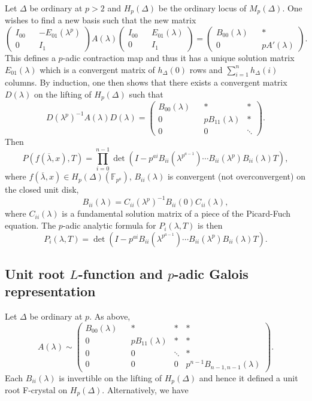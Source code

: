 \documentclass[a4paper,oneside,11pt]{article}
\theoremstyle{plain} \theoremstyle{definition}
\theoremstyle{remark}
\newcommand{\f}{\mathbb{F}}
\begin{document}
Let $\Delta$ be ordinary at $p>2$ and $H_p(\Delta)$ be the ordinary
locus of $M_p(\Delta)$. One wishes to find a new basis such that 
the new matrix 
$$\begin{pmatrix}I_{00} && -E_{01}(\lambda^p) \\
0 && I_1\end{pmatrix} 
A(\lambda)
\begin{pmatrix}I_{00} && E_{01}(\lambda) \\
0 && I_1\end{pmatrix}
=\begin{pmatrix}
B_{00}(\lambda)&&*\\ 0&&pA'(\lambda) \end{pmatrix}.$$ 
This defines a $p$-adic contraction map and thus 
it has a unique solution matrix $E_{01}(\lambda)$ which is a 
convergent matrix of $h_{\Delta}(0)$ rows and $\sum_{i=1}^n h_{\Delta}(i)$ columns. 
By induction, one then shows that there exists a convergent matrix
$D(\lambda)$ on the lifting of $H_p(\Delta)$ such that
$$D(\lambda^p)^{-1}A(\lambda)D(\lambda)=\begin{pmatrix}
B_{00}(\lambda)&&*&*\\ 0&&pB_{11}(\lambda)&*\\
0&&0&\ddots\end{pmatrix}.$$ 
Then
$$P(f(\overline{\lambda},x),T)
=\prod_{i=0}^{n-1}\det\left(I-p^{ai}B_{ii}(\lambda^{p^{a-1}})\cdots
B_{ii}(\lambda^p)B_{ii}(\lambda)T\right),$$ where
$f(\overline{\lambda}, x)\in H_p(\Delta)(\f_{p^a})$,
$B_{ii}(\lambda)$ is convergent (not overconvergent) on the closed unit disk,
$$B_{ii}(\lambda)=C_{ii}(\lambda^p)^{-1}B_{ii}(0)C_{ii}(\lambda),$$
where $C_{ii}(\lambda)$ is a fundamental solution matrix of a
piece of the Picard-Fuch equation. The $p$-adic analytic formula for $P_i(\lambda, T)$ is then
$$P_i(\lambda,T)= \det\left(I-p^{ai}B_{ii}(\lambda^{p^{a-1}})\cdots
B_{ii}(\lambda^p)B_{ii}(\lambda)T\right).$$


\subsection{Unit root $L$-function and $p$-adic Galois representation}

Let $\Delta$ be ordinary at $p$. As above,
$$A(\lambda)\sim\begin{pmatrix}
B_{00}(\lambda)&&*&*&*\\
0&&pB_{11}(\lambda)&*&*\\ 0&&0&\ddots&*\\
0&&0&0&p^{n-1}B_{n-1, n-1}(\lambda)\end{pmatrix}.$$ Each
$B_{ii}(\lambda)$ is invertible on the lifting of $H_p(\Delta)$ and hence 
it defined a unit root F-crystal on $H_p(\Delta)$. Alternatively, we have 
\end{document}
